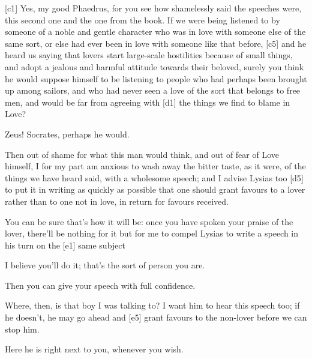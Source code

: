 {[}c1{]}  Yes, my good Phaedrus, for you see how shamelessly
said the speeches were, this second one and the one from the book. If we
were being listened to by someone of a noble and gentle character who
was in love with someone else of the same sort, or else had ever been in
love with someone like that before, {[}c5{]} and he heard us saying that
lovers start large-scale hostilities because of small things, and adopt
a jealous and harmful attitude towards their beloved, surely you think
he would suppose himself to be listening to people who had perhaps been
brought up among sailors, and who had never seen a love of the sort that
belongs to free men, and
would be far from agreeing with {[}d1{]} the things we find to blame in
Love?

 Zeus! Socrates, perhaps he would.

 Then out of shame for what this man would think, and out of
fear of Love himself, I for my part am anxious to wash away the bitter
taste, as it were, of the things we have heard said, with a wholesome
speech; and I advise Lysias too {[}d5{]} to put it in writing as quickly
as possible that one should grant favours to a lover rather than to one
not in love, in return for favours
received.

 You can be sure that's how it will be: once you have spoken
your praise of the lover, there'll be nothing for it but for me to
compel Lysias to write a speech in his turn on the {[}e1{]} same subject

 I believe you'll do it; that's the sort of person you are.

 Then you can give your speech with full confidence.

 Where, then, is that boy I was talking to? I want him to hear
this speech too; if he doesn't, he may go ahead and {[}e5{]} grant
favours to the non-lover before we can stop him.

 Here he is right next to you, whenever you
wish.

